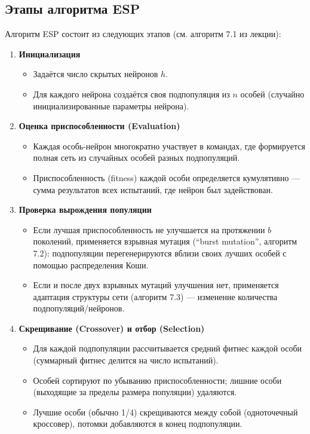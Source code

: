 \documentclass[a4paper,12pt]{article}
\begin{document}
\subsection{Этапы алгоритма ESP}
Алгоритм ESP состоит из следующих этапов (см. алгоритм 7.1 из лекции):
\begin{enumerate}
	\item \textbf{Инициализация}
	\begin{itemize}
		\item Задаётся число скрытых нейронов $h$.
		\item Для каждого нейрона создаётся своя подпопуляция из $n$ особей (случайно инициализированные параметры нейрона).
	\end{itemize}
	\item \textbf{Оценка приспособленности (Evaluation)}
	\begin{itemize}
		\item Каждая особь-нейрон многократно участвует в командах, где формируется полная сеть из случайных особей разных подпопуляций.
		\item Приспособленность (fitness) каждой особи определяется кумулятивно --- сумма результатов всех испытаний, где нейрон был задействован.
	\end{itemize}
	\item \textbf{Проверка вырождения популяции}
	\begin{itemize}
		\item Если лучшая приспособленность не улучшается на протяжении $b$ поколений, применяется взрывная мутация (``burst mutation'', алгоритм 7.2): подпопуляции перегенерируются вблизи своих лучших особей с помощью распределения Коши.
		\item Если и после двух взрывных мутаций улучшения нет, применяется адаптация структуры сети (алгоритм 7.3) --- изменение количества подпопуляций/нейронов.
	\end{itemize}
	\item \textbf{Скрещивание (Crossover) и отбор (Selection)}
	\begin{itemize}
		\item Для каждой подпопуляции рассчитывается средний фитнес каждой особи (суммарный фитнес делится на число испытаний).
		\item Особей сортируют по убыванию приспособленности; лишние особи (выходящие за пределы размера популяции) удаляются.
		\item Лучшие особи (обычно 1/4) скрещиваются между собой (одноточечный кроссовер), потомки добавляются в конец подпопуляции.

\end{itemize}
\end{enumerate}
\end{document}
